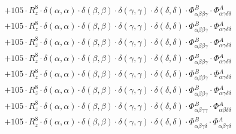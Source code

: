 \documentclass{article}
\begin{document}
\begin{subequations}
\begin{gather}
\begin{array}{c}
 \\[0.2em] 		 + 105 \cdot R_{z}^{8} \cdot \delta{}\left(\alpha{}, \alpha{}\right) \cdot \delta{}\left(\beta{}, \beta{}\right) \cdot \delta{}\left(\gamma{}, \gamma{}\right) \cdot \delta{}\left(\delta{}, \delta{}\right) \cdot \Phi{}^{B}_{\alpha{}\beta{}\beta{}\gamma{}} \cdot \Phi{}^{A}_{\alpha{}\gamma{}\delta{}\delta{}} 
 \\[0.2em] 		 + 105 \cdot R_{z}^{8} \cdot \delta{}\left(\alpha{}, \alpha{}\right) \cdot \delta{}\left(\beta{}, \beta{}\right) \cdot \delta{}\left(\gamma{}, \gamma{}\right) \cdot \delta{}\left(\delta{}, \delta{}\right) \cdot \Phi{}^{B}_{\alpha{}\beta{}\beta{}\gamma{}} \cdot \Phi{}^{A}_{\alpha{}\gamma{}\delta{}\delta{}} 
 \\[0.2em] 		 + 105 \cdot R_{z}^{8} \cdot \delta{}\left(\alpha{}, \alpha{}\right) \cdot \delta{}\left(\beta{}, \beta{}\right) \cdot \delta{}\left(\gamma{}, \gamma{}\right) \cdot \delta{}\left(\delta{}, \delta{}\right) \cdot \Phi{}^{B}_{\alpha{}\beta{}\beta{}\gamma{}} \cdot \Phi{}^{A}_{\alpha{}\gamma{}\delta{}\delta{}} 
 \\[0.2em] 		 + 105 \cdot R_{z}^{8} \cdot \delta{}\left(\alpha{}, \alpha{}\right) \cdot \delta{}\left(\beta{}, \beta{}\right) \cdot \delta{}\left(\gamma{}, \gamma{}\right) \cdot \delta{}\left(\delta{}, \delta{}\right) \cdot \Phi{}^{B}_{\alpha{}\beta{}\beta{}\gamma{}} \cdot \Phi{}^{A}_{\alpha{}\gamma{}\delta{}\delta{}} 
 \\[0.2em] 		 + 105 \cdot R_{z}^{8} \cdot \delta{}\left(\alpha{}, \alpha{}\right) \cdot \delta{}\left(\beta{}, \beta{}\right) \cdot \delta{}\left(\gamma{}, \gamma{}\right) \cdot \delta{}\left(\delta{}, \delta{}\right) \cdot \Phi{}^{B}_{\alpha{}\beta{}\beta{}\gamma{}} \cdot \Phi{}^{A}_{\alpha{}\gamma{}\delta{}\delta{}} 
 \\[0.2em] 		 + 105 \cdot R_{z}^{8} \cdot \delta{}\left(\alpha{}, \alpha{}\right) \cdot \delta{}\left(\beta{}, \beta{}\right) \cdot \delta{}\left(\gamma{}, \gamma{}\right) \cdot \delta{}\left(\delta{}, \delta{}\right) \cdot \Phi{}^{B}_{\alpha{}\beta{}\beta{}\gamma{}} \cdot \Phi{}^{A}_{\alpha{}\gamma{}\delta{}\delta{}} 
 \\[0.2em] 		 + 105 \cdot R_{z}^{8} \cdot \delta{}\left(\alpha{}, \alpha{}\right) \cdot \delta{}\left(\beta{}, \beta{}\right) \cdot \delta{}\left(\gamma{}, \gamma{}\right) \cdot \delta{}\left(\delta{}, \delta{}\right) \cdot \Phi{}^{B}_{\alpha{}\beta{}\gamma{}\gamma{}} \cdot \Phi{}^{A}_{\alpha{}\beta{}\delta{}\delta{}} 
 \\[0.2em] 		 + 105 \cdot R_{z}^{8} \cdot \delta{}\left(\alpha{}, \alpha{}\right) \cdot \delta{}\left(\beta{}, \beta{}\right) \cdot \delta{}\left(\gamma{}, \gamma{}\right) \cdot \delta{}\left(\delta{}, \delta{}\right) \cdot \Phi{}^{B}_{\alpha{}\beta{}\gamma{}\delta{}} \cdot \Phi{}^{A}_{\alpha{}\beta{}\gamma{}\delta{}} 

\end{array}
\end{gather}
\end{subequations}
\end{document}
